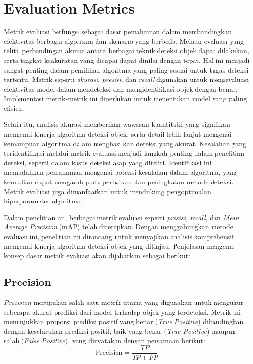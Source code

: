 \section{Evaluation Metrics}
\label{sec:Evaluation Metrics}

Metrik evaluasi berfungsi sebagai dasar pemahaman dalam membandingkan efektivitas berbagai algoritma dan skenario yang berbeda. Melalui evaluasi yang teliti, perbandingan akurat antara berbagai teknik deteksi objek dapat dilakukan, serta tingkat keakuratan yang dicapai dapat dinilai dengan tepat. Hal ini menjadi sangat penting dalam pemilihan algoritma yang paling sesuai untuk tugas deteksi tertentu. Metrik seperti \emph{akurasi}, \emph{presisi}, dan \emph{recall} digunakan untuk mengevaluasi efektivitas model dalam mendeteksi dan mengidentifikasi objek dengan benar. Implementasi metrik-metrik ini diperlukan untuk menentukan model yang paling efisien.

Selain itu, analisis akurasi memberikan wawasan kuantitatif yang signifikan mengenai kinerja algoritma deteksi objek, serta detail lebih lanjut mengenai kemampuan algoritma dalam menghasilkan deteksi yang akurat. Kesalahan yang teridentifikasi melalui metrik evaluasi menjadi langkah penting dalam penelitian deteksi, seperti dalam kasus deteksi asap yang diteliti. Identifikasi ini memudahkan pemahaman mengenai potensi kesalahan dalam algoritma, yang kemudian dapat mengarah pada perbaikan dan peningkatan metode deteksi. Metrik evaluasi juga dimanfaatkan untuk mendukung pengoptimalan hiperparameter algoritma.

Dalam penelitian ini, berbagai metrik evaluasi seperti \emph{presisi}, \emph{recall}, dan \emph{Mean Average Precision} (mAP) telah diterapkan. Dengan menggabungkan metode evaluasi ini, penelitian ini dirancang untuk menyajikan analisis komprehensif mengenai kinerja algoritma deteksi objek yang ditinjau. Penjelasan mengenai konsep dasar metrik evaluasi akan dijabarkan sebagai berikut:

\subsection{Precision}
\label{subsec:precision}

\emph{Precision} merupakan salah satu metrik utama yang digunakan untuk mengukur seberapa akurat prediksi dari model terhadap objek yang terdeteksi. Metrik ini menunjukkan proporsi prediksi positif yang benar (\emph{True Positive}) dibandingkan dengan keseluruhan prediksi positif, baik yang benar (\emph{True Positive}) maupun salah (\emph{False Positive}), yang dinyatakan dengan persamaan berikut: 
\begin{equation} 
  \mathrm{Precision} = \frac{TP}{TP + FP} 
\end{equation}

